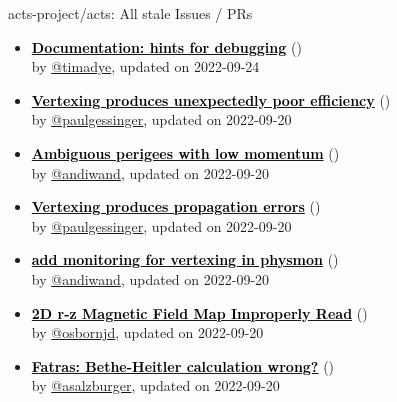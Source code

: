 \begin{frame}[allowframebreaks]{ acts-project/acts: All stale Issues / PRs}
\begin{itemize}
    \item\iss\prstale\textbf{\href{https://github.com/acts-project/acts/issues/1463}{\textcolor{black}{Documentation: hints for debugging}}}
    (\href{https://github.com/acts-project/acts/issues/1463}{}) \\
    by \href{https://github.com/timadye}{@timadye}, updated on 2022-09-24

    \item\iss\prstale\textbf{\href{https://github.com/acts-project/acts/issues/1362}{\textcolor{black}{Vertexing produces unexpectedly poor efficiency}}}
    (\href{https://github.com/acts-project/acts/issues/1362}{}) \\
    by \href{https://github.com/paulgessinger}{@paulgessinger}, updated on 2022-09-20

    \item\iss\prstale\textbf{\href{https://github.com/acts-project/acts/issues/1386}{\textcolor{black}{Ambiguous perigees with low momentum}}}
    (\href{https://github.com/acts-project/acts/issues/1386}{}) \\
    by \href{https://github.com/andiwand}{@andiwand}, updated on 2022-09-20

    \item\iss\prstale\textbf{\href{https://github.com/acts-project/acts/issues/1345}{\textcolor{black}{Vertexing produces propagation errors}}}
    (\href{https://github.com/acts-project/acts/issues/1345}{}) \\
    by \href{https://github.com/paulgessinger}{@paulgessinger}, updated on 2022-09-20

    \item\iss\prstale\textbf{\href{https://github.com/acts-project/acts/issues/1313}{\textcolor{black}{add monitoring for vertexing in physmon}}}
    (\href{https://github.com/acts-project/acts/issues/1313}{}) \\
    by \href{https://github.com/andiwand}{@andiwand}, updated on 2022-09-20

    \item\iss\prstale\textbf{\href{https://github.com/acts-project/acts/issues/669}{\textcolor{black}{2D r-z Magnetic Field Map Improperly Read}}}
    (\href{https://github.com/acts-project/acts/issues/669}{}) \\
    by \href{https://github.com/osbornjd}{@osbornjd}, updated on 2022-09-20

    \item\iss\prstale\textbf{\href{https://github.com/acts-project/acts/issues/1437}{\textcolor{black}{Fatras: Bethe-Heitler calculation wrong?}}}
    (\href{https://github.com/acts-project/acts/issues/1437}{}) \\
    by \href{https://github.com/asalzburger}{@asalzburger}, updated on 2022-09-20


\end{itemize}
\end{frame}
